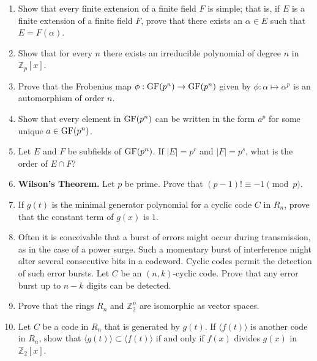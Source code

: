 {\begin{enumerate}
\item
Show that every finite extension of a finite field $F$ is simple;
that is, if $E$ is a finite extension of a finite field $F$, prove
that there exists an $\alpha \in E$ such that $E = F( \alpha )$.


\item
Show that for every $n$ there exists an irreducible polynomial of 
degree $n$ in~${\mathbb Z}_p[x]$.



\item \label{exercise:finite:frobeniusmap}
Prove that the {\bfi Frobenius map} $\phi : \operatorname{GF}(p^n) \rightarrow \operatorname{GF}(p^n)$ given by $\phi : \alpha \mapsto
\alpha^p$ is an automorphism of order $n$. 


\item
Show that every element in $\operatorname{GF}(p^n)$ can be written in the form
$a^p$ for some unique $a \in \operatorname{GF}(p^n)$.


\item
Let $E$ and $F$ be subfields of $\operatorname{GF}(p^n)$. If $|E| = p^r$ and
$|F| = p^s$, what is the order of $E \cap F$? 


\item
{\bf Wilson's Theorem.}
Let $p$ be prime.  Prove that $(p-1)! \equiv -1 \pmod{p}$. 


\item
If $g(t)$ is the minimal generator polynomial for a cyclic code $C$ in
$R_n$, prove that the constant term of $g(x)$ is $1$.


\item
Often it is conceivable that a burst of errors might occur during
transmission, as in the case of a power surge.  Such a momentary burst
of interference might alter several consecutive bits in a codeword.
Cyclic codes permit the detection of such error bursts. Let $C$ be an
$(n,k)$-cyclic code. Prove that any error burst up to $n-k$ digits can
be detected.  


\item
Prove that the rings $R_n$ and ${\mathbb Z}_2^n$ are isomorphic as vector
spaces. 


\item
Let $C$ be a code in $R_n$ that is generated by $g(t)$. If $\langle
f(t) \rangle$ is another code in $R_n$, show that $\langle g(t) \rangle
\subset \langle f(t) \rangle$ if and only if $f(x)$ divides $g(x)$ in
${\mathbb Z}_2[x]$.



\end{enumerate}}
